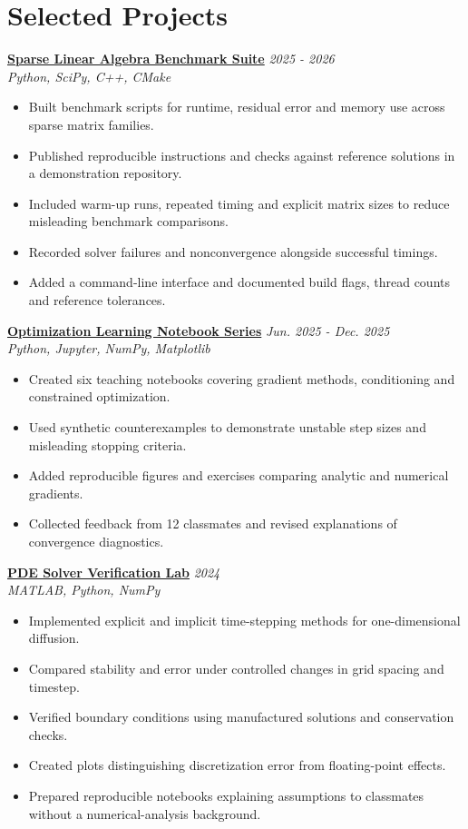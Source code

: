 \documentclass[11pt,a4paper]{article}
\begin{document}
\section{Selected Projects}
\textbf{\href{https://example.com/demos/sparse-benchmarks}{Sparse Linear Algebra Benchmark Suite}} \hfill \textit{2025 - 2026}\\
\textit{Python, SciPy, C++, CMake}
\begin{itemize}[leftmargin=*,noitemsep,topsep=2pt]
\item Built benchmark scripts for runtime, residual error and memory use across sparse matrix families.
\item Published reproducible instructions and checks against reference solutions in a demonstration repository.
\item Included warm-up runs, repeated timing and explicit matrix sizes to reduce misleading benchmark comparisons.
\item Recorded solver failures and nonconvergence alongside successful timings.
\item Added a command-line interface and documented build flags, thread counts and reference tolerances.
\end{itemize}

\textbf{\href{https://example.com/demos/optimization-notebooks}{Optimization Learning Notebook Series}} \hfill \textit{Jun. 2025 - Dec. 2025}\\
\textit{Python, Jupyter, NumPy, Matplotlib}
\begin{itemize}[leftmargin=*,noitemsep,topsep=2pt]
\item Created six teaching notebooks covering gradient methods, conditioning and constrained optimization.
\item Used synthetic counterexamples to demonstrate unstable step sizes and misleading stopping criteria.
\item Added reproducible figures and exercises comparing analytic and numerical gradients.
\item Collected feedback from 12 classmates and revised explanations of convergence diagnostics.
\end{itemize}

\textbf{\href{https://example.com/demos/pde-solver-verification-lab}{PDE Solver Verification Lab}} \hfill \textit{2024}\\
\textit{MATLAB, Python, NumPy}
\begin{itemize}[leftmargin=*,noitemsep,topsep=2pt]
\item Implemented explicit and implicit time-stepping methods for one-dimensional diffusion.
\item Compared stability and error under controlled changes in grid spacing and timestep.
\item Verified boundary conditions using manufactured solutions and conservation checks.
\item Created plots distinguishing discretization error from floating-point effects.
\item Prepared reproducible notebooks explaining assumptions to classmates without a numerical-analysis background.
\end{itemize}
\end{document}
